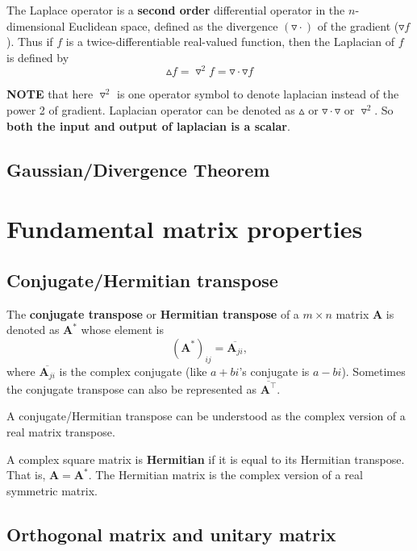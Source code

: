 \documentclass[12pt]{article}
\numberwithin{equation}{section}
\begin{document}
The Laplace operator is a \textbf{second order} differential operator in the $n$-dimensional Euclidean space, defined as the divergence $(\triangledown \cdot)$ of the gradient ($\triangledown f$). Thus if $f$ is a twice-differentiable real-valued function, then the Laplacian of $f$ is defined by
\begin{equation}
\vartriangle f = \triangledown^2 f = \triangledown \cdot \triangledown f
\end{equation}

\textbf{NOTE} that here $\triangledown^2$ is one operator symbol to denote laplacian instead of the power 2 of gradient. Laplacian operator can be denoted as $\vartriangle$ or $\triangledown \cdot \triangledown$ or $\triangledown^2$. So \textbf{both the input and output of laplacian is a scalar}.


\subsection{Gaussian/Divergence Theorem}

\newpage

\section{Fundamental matrix properties}

\subsection{Conjugate/Hermitian transpose}

The \textbf{conjugate transpose} or \textbf{Hermitian transpose } of a $m\times n$ matrix $\mathbf{A}$ is denoted as $\mathbf{A}^*$ whose element is
\begin{equation}
(\mathbf{A}^*)_{ij} = \overline{\mathbf{A}_{ji}},
\end{equation}
where $\overline{\mathbf{A}_{ji}}$ is the complex conjugate (like $a + bi$'s conjugate is $a - bi$). Sometimes the conjugate transpose can also be represented as $\overline{\mathbf{A}^\top}$.

A conjugate/Hermitian transpose can be understood as the complex version of a real matrix transpose.

A complex square matrix is \textbf{Hermitian} if it is equal to its Hermitian transpose. That is, $\mathbf{A = A^*}$. The Hermitian matrix is the complex version of a real symmetric matrix.

\subsection{Orthogonal matrix and unitary matrix}
\label{sec:orthogonal}
\end{document}

